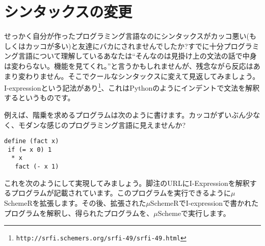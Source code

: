 \section{シンタックスの変更}
せっかく自分が作ったプログラミング言語なのにシンタックスがカッコ悪い(もしくはカッコが多い)と友達にバカにされませんでしたか?すでに十分プログラミング言語について理解しているあなたは“そんなのは見掛け上の文法の話で中身は変わらない。機能を見てくれ。”と言うかもしれませんが、残念ながら反応はあまり変わりません。そこでクールなシンタックスに変えて見返してみましょう。
I-expressionという記法があり\footnote{{\tt http://srfi.schemers.org/srfi-49/srfi-49.html}}、これはPythonのようにインデントで文法を解釈するというものです。 

例えば、階乗を求めるプログラムは次のように書けます。カッコがずいぶん少なく、モダンな感じのプログラミング言語に見えませんか?

\begin{lstlisting}
define (fact x)
 if (= x 0) 1
  * x
   fact (- x 1)
\end{lstlisting}

これを次のようにして実現してみましょう。脚注のURLにI-Expressionを解釈するプログラムが記載されています。このプログラムを実行できるように$\mu$SchemeRを拡張します。その後、拡張された$\mu$SchemeRでI-expressionで書かれたプログラムを解釈し、得られたプログラムを、$\mu$Schemeで実行します。

